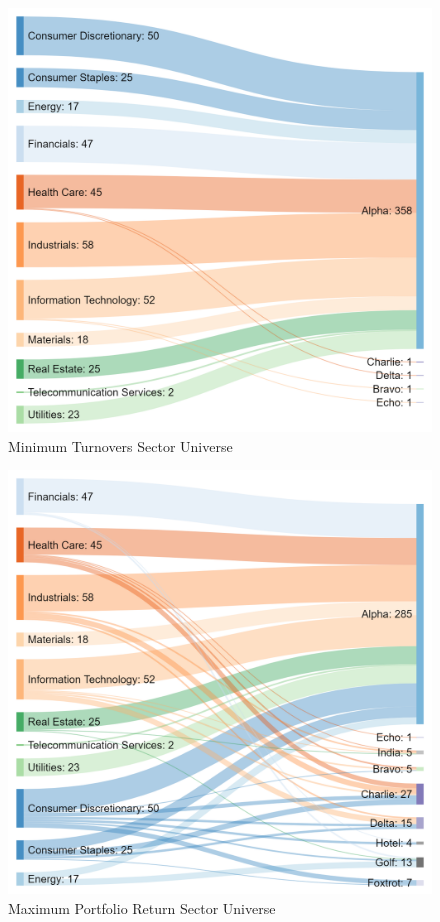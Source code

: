 \documentclass[../main.tex]{subfiles}
\begin{document}
\begin{figure}[H]
    \centering
    \includegraphics[scale=0.2]{images/single_2017_5.png}
    \caption{Minimum Turnovers Sector Universe}
    \label{fig:optimal_sector_universes:min_turnover}
\end{figure} 

\begin{figure}[H]
    \centering
    \includegraphics[scale=0.2]{images/complete_2017_9.png}
    \caption{Maximum Portfolio Return Sector Universe}
    \label{fig:optimal_sector_universes:max_return}
\end{figure}
\end{document}
